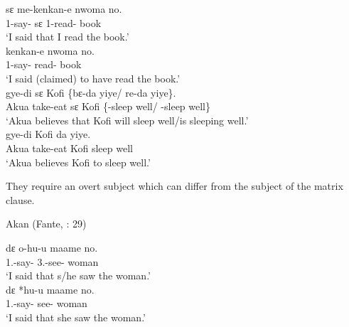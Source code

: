 \documentclass[output=paper]{langscibook}
\begin{document}
\begin{exe}
{\begin{exe}
\begin{xlist}
\end{xlist}
\end{exe}}

\begin{xlist}
\ex \label{Paj11a}

 {s{ɛ}} {me-kenkan-e} {nwoma} {no.} \\
    1{\sg}-say-{\compl} s{ɛ} 1{\sg}-read-{\compl} book \\
\glt `I said that I read the book.’\\

\ex \label{Paj11b}
 {kenkan-e} {nwoma} {no.} \\
    1{\sg}-say-{\compl} read-{\compl} book \\
\glt `I said (claimed) to have read the book.’\\

\ex \label{Paj11c}
 {gye-di} {s{ɛ}} {Kofi} \{{b{ɛ}-da} {yiye}/ {re-da} {yiye}\}. \\
   Akua take-eat s{ɛ} Kofi \{-sleep well/ -sleep well\}\\
\glt `Akua believes that Kofi will sleep well/is sleeping well.'\\

\ex \label{Paj11d}
 {gye-di} {Kofi} {da} {yiye.} \\
     Akua take-eat Kofi sleep well\\
\glt `Akua believes Kofi to sleep well.'\\

\end{xlist}
\end{exe}

They require an overt subject which can differ from the subject of the matrix clause.

\begin{exe}
\ex \label{Paj12} Akan (Fante, \citealt{osam1998}: 29)
\begin{xlist}

\ex \label{Paj12a} 
 {d{ɛ}} {o-hu-u} {maame} {no.} \\
    1{\sg}.{\subj}-say-{\compl} {\comp} 3{\sg}.{\subj}-see-{\compl} woman \\
\glt `I said that s/he saw the woman.’\\

\ex \label{Paj12b}
 {d{ɛ}} *{hu-u} {maame} {no.} \\
    1{\sg}.{\subj}-say-{\compl} {\comp} see-{\compl} woman \\
\glt `I said that she saw the woman.’\\

\end{xlist}
\end{exe}
 
\end{document}
